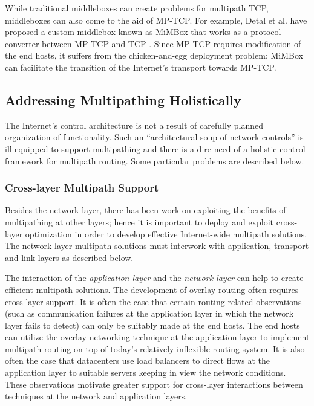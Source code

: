 \documentclass[10pt]{IEEEtran}
\begin{document}
While traditional middleboxes can create problems for multipath TCP,  middleboxes can also come to the aid of MP-TCP. For example, Detal et al. have proposed a custom middlebox known as MiMBox that works as a protocol converter between MP-TCP and TCP \cite{detal2013multipath}. Since MP-TCP requires modification of the end hosts, it suffers from the chicken-and-egg deployment problem; MiMBox can facilitate the transition of the Internet's transport towards MP-TCP.

\subsection{Addressing Multipathing Holistically}

The Internet's control architecture is not a result of carefully planned organization of functionality. Such an ``architectural soup of network controls'' is ill equipped to support multipathing and there is a dire need of a holistic control framework for multipath routing. Some particular problems are described below.


\vspace{2mm}
\subsubsection{Cross-layer Multipath Support}

Besides the network layer, there has been work on exploiting the benefits of multipathing at other layers; hence it is important to deploy and exploit cross-layer optimization in order to develop effective Internet-wide multipath solutions. The network layer multipath solutions must interwork with application, transport and link layers as described below.

\vspace{1mm}
The interaction of the \textit{application layer} and the \textit{network layer} can help to create efficient multipath solutions. The development of overlay routing often requires cross-layer support. It is often the case that certain routing-related observations (such as communication failures at the application layer in which the network layer fails to detect) can only be suitably made at the end hosts. The end hosts can utilize the overlay networking technique at the application layer to implement multipath routing on top of today's relatively inflexible routing system. It is also often the case that datacenters use load balancers to direct flows at the application layer to suitable servers keeping in view the network conditions. These observations motivate greater support for cross-layer interactions between techniques at the network and application layers.
\end{document}
